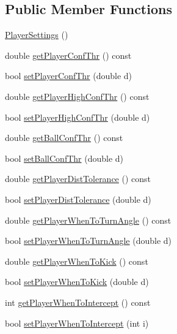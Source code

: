\subsection*{Public Member Functions}
\begin{DoxyCompactItemize}
\item 
\hyperlink{classPlayerSettings_a0e73d43f99035a73efd94d51fd79e857}{Player\+Settings} ()
\item 
double \hyperlink{classPlayerSettings_a8113fecdb89ad86088d21e476405e4af}{get\+Player\+Conf\+Thr} () const 
\item 
bool \hyperlink{classPlayerSettings_a52b378a998340e01c41802fe4389f409}{set\+Player\+Conf\+Thr} (double d)
\item 
double \hyperlink{classPlayerSettings_a93667848519fcb52bd064d77e4a6e4f0}{get\+Player\+High\+Conf\+Thr} () const 
\item 
bool \hyperlink{classPlayerSettings_a833c0c4d30e2a625b2488ae488c5396c}{set\+Player\+High\+Conf\+Thr} (double d)
\item 
double \hyperlink{classPlayerSettings_ab8653b9920f4ad85ba19cc516523aa16}{get\+Ball\+Conf\+Thr} () const 
\item 
bool \hyperlink{classPlayerSettings_a738e71b55facd7256851dcbe7dfe24d4}{set\+Ball\+Conf\+Thr} (double d)
\item 
double \hyperlink{classPlayerSettings_a7b8fa5c91609d9993dc973cf6354c346}{get\+Player\+Dist\+Tolerance} () const 
\item 
bool \hyperlink{classPlayerSettings_adc174df162062e2274798376b017b741}{set\+Player\+Dist\+Tolerance} (double d)
\item 
double \hyperlink{classPlayerSettings_aaecbda8f2b284386d1349dbd32639d7f}{get\+Player\+When\+To\+Turn\+Angle} () const 
\item 
bool \hyperlink{classPlayerSettings_a224e566290a4c60c6523b1568c424583}{set\+Player\+When\+To\+Turn\+Angle} (double d)
\item 
double \hyperlink{classPlayerSettings_a42fcf95dc84b163c78d357170adba9bb}{get\+Player\+When\+To\+Kick} () const 
\item 
bool \hyperlink{classPlayerSettings_aefd09709861259de098e96e37e209aca}{set\+Player\+When\+To\+Kick} (double d)
\item 
int \hyperlink{classPlayerSettings_af7e1485098da6877a906fd202720cb3b}{get\+Player\+When\+To\+Intercept} () const 
\item 
bool \hyperlink{classPlayerSettings_ad18e3bf9f16696902e046a6547a8ac06}{set\+Player\+When\+To\+Intercept} (int i)

\end{DoxyCompactItemize}
